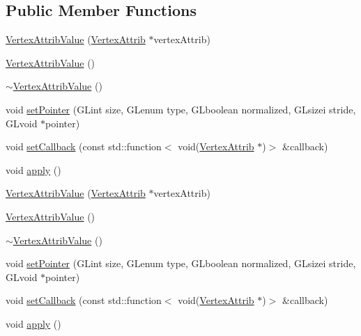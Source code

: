 \subsection*{Public Member Functions}
\begin{DoxyCompactItemize}
\item 
\hyperlink{classVertexAttribValue_adc98209b6f57808f0d96168c5e90bb5d}{Vertex\+Attrib\+Value} (\hyperlink{structVertexAttrib}{Vertex\+Attrib} $\ast$vertex\+Attrib)
\item 
\hyperlink{classVertexAttribValue_aa2c996c4b7c97e2abd937fd9cd2e8449}{Vertex\+Attrib\+Value} ()
\item 
\hyperlink{classVertexAttribValue_a69235def4f8e47c95da5203f5d5b7f56}{$\sim$\+Vertex\+Attrib\+Value} ()
\item 
void \hyperlink{classVertexAttribValue_aa60f95167e0f4f532db83aa9538e143c}{set\+Pointer} (G\+Lint size, G\+Lenum type, G\+Lboolean normalized, G\+Lsizei stride, G\+Lvoid $\ast$pointer)
\item 
void \hyperlink{classVertexAttribValue_a400a133fa7dd41f7cb6037a25c3853a8}{set\+Callback} (const std\+::function$<$ void(\hyperlink{structVertexAttrib}{Vertex\+Attrib} $\ast$)$>$ \&callback)
\item 
void \hyperlink{classVertexAttribValue_ab3c1c0a39391f1b80c9cde9b0c3e72b2}{apply} ()
\item 
\hyperlink{classVertexAttribValue_adc98209b6f57808f0d96168c5e90bb5d}{Vertex\+Attrib\+Value} (\hyperlink{structVertexAttrib}{Vertex\+Attrib} $\ast$vertex\+Attrib)
\item 
\hyperlink{classVertexAttribValue_aa2c996c4b7c97e2abd937fd9cd2e8449}{Vertex\+Attrib\+Value} ()
\item 
\hyperlink{classVertexAttribValue_a69235def4f8e47c95da5203f5d5b7f56}{$\sim$\+Vertex\+Attrib\+Value} ()
\item 
void \hyperlink{classVertexAttribValue_aa60f95167e0f4f532db83aa9538e143c}{set\+Pointer} (G\+Lint size, G\+Lenum type, G\+Lboolean normalized, G\+Lsizei stride, G\+Lvoid $\ast$pointer)
\item 
void \hyperlink{classVertexAttribValue_a400a133fa7dd41f7cb6037a25c3853a8}{set\+Callback} (const std\+::function$<$ void(\hyperlink{structVertexAttrib}{Vertex\+Attrib} $\ast$)$>$ \&callback)
\item 
void \hyperlink{classVertexAttribValue_ab3c1c0a39391f1b80c9cde9b0c3e72b2}{apply} ()
\end{DoxyCompactItemize}
